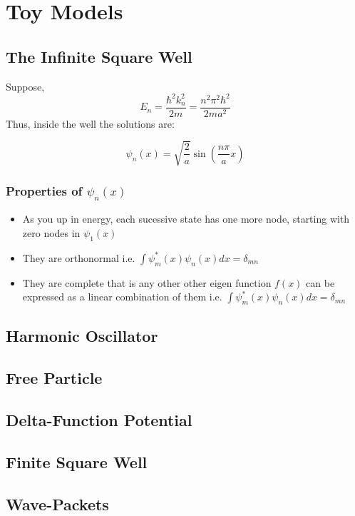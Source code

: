 \chapter{Toy Models}
\section{The Infinite Square Well}
Suppose,
\begin{equation}
E_{n} = \frac{\hbar^{2}k^{2}_{n}}{2m} = \frac{n^{2} \pi^{2} \hbar^{2}}{2m a^{2}}
\end{equation}
Thus, inside the well the solutions are:
\begin{tcolorbox}
\begin{equation}
\psi_{n}(x) = \sqrt{\frac{2}{a}} \sin(\frac{n \pi}{a}x)
\end{equation}
\end{tcolorbox}
\subsection{Properties of $\psi_{n}(x)$}
\begin{itemize}
\item As you up in energy, each sucessive state has one more node, starting with zero nodes in $\psi_{1}(x)$
\item They are orthonormal i.e. $\int \psi^{*}_{m}(x) \psi_{n}(x) dx = \delta_{mn}$
\item They are complete that is any other other eigen function $f(x)$ can be expressed as a linear combination of them i.e. $\int \psi^{*}_{m}(x) \psi_{n}(x) dx = \delta_{mn}$
\end{itemize}
\section{Harmonic Oscillator}
\section{Free Particle}
\section{Delta-Function Potential}
\section{Finite Square Well}
\section{Wave-Packets}
